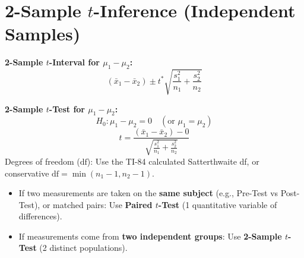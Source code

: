 \section{2-Sample $t$-Inference (Independent Samples)}

\begin{formulabox}
\textbf{2-Sample $t$-Interval for $\mu_1 - \mu_2$:}
\[
(\bar{x}_1 - \bar{x}_2) \pm t^* \sqrt{\frac{s_1^2}{n_1} + \frac{s_2^2}{n_2}}
\]

\textbf{2-Sample $t$-Test for $\mu_1 - \mu_2$:}
\[
H_0: \mu_1 - \mu_2 = 0 \quad (\text{or } \mu_1 = \mu_2)
\]
\[
t = \frac{(\bar{x}_1 - \bar{x}_2) - 0}{\sqrt{\frac{s_1^2}{n_1} + \frac{s_2^2}{n_2}}}
\]
Degrees of freedom ($\text{df}$): Use the TI-84 calculated Satterthwaite df, or conservative $\text{df} = \min(n_1 - 1, n_2 - 1)$.
\end{formulabox}

\begin{trapbox}
\begin{itemize}
    \item If two measurements are taken on the \textbf{same subject} (e.g., Pre-Test vs Post-Test), or matched pairs: Use \textbf{Paired $t$-Test} (1 quantitative variable of differences).
    \item If measurements come from \textbf{two independent groups}: Use \textbf{2-Sample $t$-Test} (2 distinct populations).
\end{itemize}
\end{trapbox}
